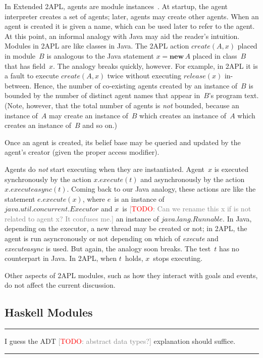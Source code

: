 \documentclass[conference,compsoc]{IEEEtran}
\newcommand{\todo}[1]{{\small \textcolor{gray}{[\textcolor{red}{TODO}: #1]}}}
\newenvironment{notes}{\medskip\hrule\nobreak\smallskip\narrower}{\smallskip\hrule\medskip}
\begin{document}
In Extended 2APL, agents are module
instances~\cite{DBLP:conf/prima/DastaniMS08}. At startup, the agent
interpreter creates a set of agents; later, agents may create other agents.
When an agent is created it is given a name, which can be used later to
refer to the agent. At this point, an informal analogy with Java may aid
the reader's intuition. Modules in 2APL are like classes in Java. The 2APL
action $\mathit{create}(A,x)$ placed in module~$B$ is analogous to the Java
statement $x=\mathbf{new}\,A$ placed in class~$B$ that has field~$x$.  The
analogy breaks quickly, however. For example, in 2APL it is a fault to
execute $\mathit{create}(A,x)$ twice without executing
$\mathit{release}(x)$ in-between. Hence, the number of co-existing agents
created by an instance of~$B$ is bounded by the number of distinct agent
names that appear in~$B$'s program text. (Note, however, that the total
number of agents is \emph{not} bounded, because an instance of~$A$ may
create an instance of~$B$ which creates an instance of~$A$ which creates an
instance of~$B$ and so on.)

Once an agent is created, its belief base may be queried and updated by the
agent's creator (given the proper access modifier).

Agents do \emph{not} start executing when they are instantiated. Agent~$x$
is executed synchronously by the action $x.\mathit{execute}(t)$ and
asynchronously by the action $x.\mathit{executeasync}(t)$. Coming back to
our Java analogy, these actions are like the statement
$e.\mathit{execute}(x)$, where $e$~is an instance of
$\mathit{java}.\mathit{util}.\mathit{concurrent}.\mathit{Executor}$ and
$x$~is \todo{Can we rename this x if is not related to agent x? It confuses
me.} an instance of $\mathit{java}.\mathit{lang}.\mathit{Runnable}$.  In
Java, depending on the executor, a new thread may be created or not; in
2APL, the agent is run asyncronously or not depending on which of
\textit{execute} and \textit{executeasync} is used. But again, the analogy
soon breaks. The test~$t$ has no counterpart in Java. In 2APL, when
$t$~holds, $x$~stops executing.

Other aspects of 2APL modules, such as how they interact with goals and
events, do not affect the current discussion.

\subsection{Haskell Modules}

\begin{notes}
I guess the ADT \todo{abstract data types?} explanation should suffice.
\end{notes}
\end{document}
